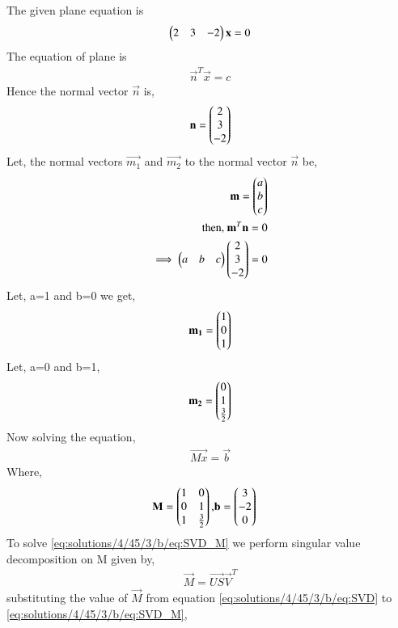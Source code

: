 The given plane equation is
\begin{align}
\begin{pmatrix}2&3&-2\end{pmatrix}\mathbf{x} = 0\label{eq:solutions/4/45/3/b/eq:genform}\\
\end{align}
The equation of plane is
\begin{align}
\vec{n}^T\vec{x} = c
\end{align}
Hence the normal vector $\vec{n}$ is,
\begin{align}
\mathbf{n} = \begin{pmatrix}2\\3\\-2\end{pmatrix}
\end{align}
Let, the normal vectors $\vec{m_1}$ and $\vec{m_2}$ to the normal vector $\vec{n}$ be, 
\begin{align}
\mathbf{m} = \begin{pmatrix}a\\b\\c\end{pmatrix}\\
\mbox{then, } \mathbf{m}^T\mathbf{n} = 0\\
\implies \begin{pmatrix}a&b&c\end{pmatrix}\begin{pmatrix}2\\3\\-2\end{pmatrix} = 0
\end{align}  
Let, a=1 and b=0 we get,
\begin{align}
\mathbf{m_1} = \begin{pmatrix}1\\0\\1\end{pmatrix}
\end{align}
Let, a=0 and b=1,
\begin{align}
\mathbf{m_2} = \begin{pmatrix}0\\1\\\frac{3}{2}\end{pmatrix}
\end{align}
Now solving the equation,
\begin{align}
\vec{Mx} = \vec{b}
\label{eq:solutions/4/45/3/b/eq:SVD_M}
\end{align}
Where,
\begin{align}
\mathbf{M} = \begin{pmatrix}1&0\\0&1\\1&\frac{3}{2}\end{pmatrix} , & \mathbf{b} = \begin{pmatrix}3\\-2\\0\end{pmatrix}\label{eq:solutions/4/45/3/b/eq:b}
\end{align}
To solve \eqref{eq:solutions/4/45/3/b/eq:SVD_M} we perform singular value decomposition on M given by, 
\begin{align}
\vec{M} = \vec{US}\vec{V}^T
\label{eq:solutions/4/45/3/b/eq:SVD}
\end{align}
substituting the value of $\vec{M}$ from equation \eqref{eq:solutions/4/45/3/b/eq:SVD} to \eqref{eq:solutions/4/45/3/b/eq:SVD_M},
